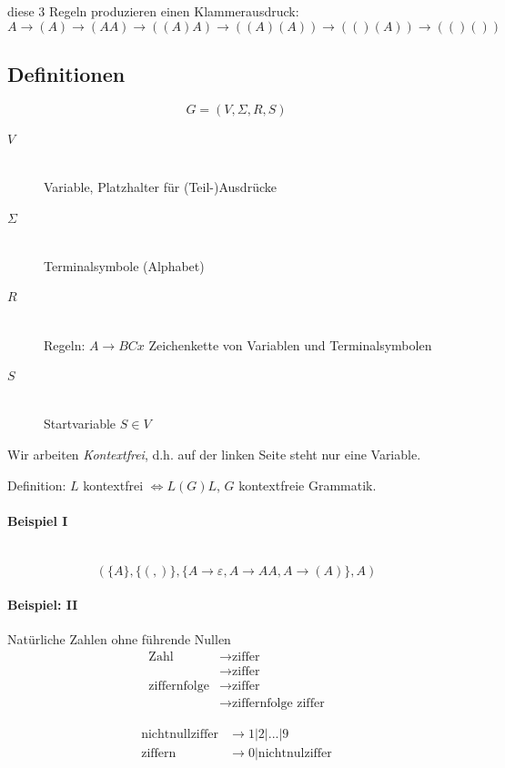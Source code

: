 diese 3 Regeln produzieren einen Klammerausdruck:
\[
	A \to (A) \to (AA) \to ((A)A) \to ((A)(A)) \to (()(A)) \to (()())
\]

\subsection{Definitionen}

\[
	G = (V, \Sigma, R, S)
\]

\begin{description}
	\item[$V$] \hfill \\
		Variable, Platzhalter für (Teil-)Ausdrücke
	\item[$\Sigma$] \hfill \\
		Terminalsymbole (Alphabet)
	\item[$R$] \hfill \\
		Regeln: $A \to BCx$ Zeichenkette von Variablen und Terminalsymbolen
	\item[$S$] \hfill \\
		Startvariable $S \in V$
\end{description}

Wir arbeiten \emph{Kontextfrei}, d.h. auf der linken Seite steht nur eine Variable.

Definition: $L$ kontextfrei $\Leftrightarrow L(G)  L$, $G$ kontextfreie Grammatik.


\paragraph{Beispiel I} \hfill \\
\[
	(\{A\}, \{(,)\}, \{A \to \varepsilon, A \to AA, A \to (A)\}, A)
\]

\paragraph{Beispiel: II}

Natürliche Zahlen ohne führende Nullen
\begin{align*}
	\text{Zahl} &\to \text{ziffer} \\
	\text{} &\to \text{ziffer} \\
	\text{ziffernfolge} &\to \text{ziffer} \\
	\text{} &\to \text{ziffernfolge ziffer}
\end{align*}

\begin{align*}
	\text{nichtnullziffer} &\to 1 | 2 | ... | 9 \\
	\text{ziffern} &\to 0 | \text{nichtnulziffer}
\end{align*}


